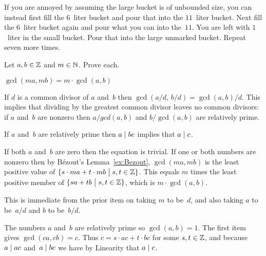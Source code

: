 \documentclass{ibl}  %
\begin{document}
\begin{bezoutproof}
\begin{ex}
\begin{ans}
If you are annoyed by assuming the large bucket is of unbounded size, you
can instead
first fill the $6$~liter bucket and pour that into the $11$~liter bucket.
Next fill the $6$~liter bucket again and pour what you can into the~$11$.
You are left with $1$~liter in the small bucket.  
Pour that into the large unmarked bucket.
Repeat seven more times.    
\end{ans}
\end{ex}

\begin{ex}  \label{ex:EuclidsLemma}
Let $a,b\in\mathbb{Z}$ and $m\in\mathbb{N}$. 
Prove each.
\begin{exes}
\item $\gcd(ma,mb)=m\cdot\gcd(a,b)$
\item If $d$ is a common divisor of $a$ and~$b$ then 
  $\gcd(a/d,\,b/d)=\gcd(a,b)/d$.
  This implies that 
  dividing by the greatest common divisor leaves no common divisors:
  if $a$ and~$b$ are nonzero then $a/gcd(a,b)$ and $b/\gcd(a,b)$
  are relatively prime.
\item {}  
  If $a$ and~$b$ are relatively prime then $a\mid bc$ implies that 
  $a\mid c$.
\end{exes}
\begin{ans}
\begin{exes}
\item If both $a$ and~$b$ are zero then the equation is trivial.
  If one or both numbers are nonzero then by 
  B\'ezout's Lemma~\ref{ex:Bezout}, $\gcd(ma,mb)$ is the least
  positive value of $\{s\cdot ma+t\cdot mb \bigm| s,t\in\mathbb{Z}\}$.
  This equals $m$ times the least positive member of 
  $\{sa+tb \bigm| s,t\in\mathbb{Z}\}$, 
  which is $m\cdot\gcd(a,b)$.
\item This is immediate from the prior item on taking $m$ to be~$d$, 
  and also taking $a$ to be~$a/d$ and $b$ to be~$b/d$.     
\item The numbers $a$ and~$b$ are relatively prime so $\gcd(a,b)=1$.
  The first item gives $\gcd(ca,cb)=c$.
  Thus $c=s\cdot ac+t\cdot bc$ for some $s,t\in\mathbb{Z}$, and
  because $a\mid ac$ and~$a\mid bc$ we have by Linearity that
  $a\mid c$.
\end{exes}
\end{ans}
\end{ex}
\end{bezoutproof}
\end{document}
